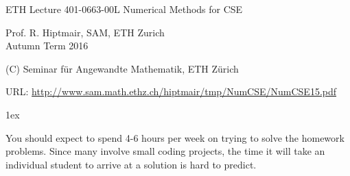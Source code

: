 \documentclass[12pt]{report}
\begin{document}
\begin{tcolorbox}[colframe=black]
\begin{minipage}[t][0.6\textwidth][c]{\textwidth}
  ETH Lecture 401-0663-00L  Numerical Methods for CSE 
  \B\vspace{1.5cm}
  
  \begin{center}
  \end{center}
  \vspace{1.5cm}
  
  \begin{center}
  \begin{large}
    {\Large Prof. R. Hiptmair, SAM, ETH Zurich}\\[1.5ex]

    Autumn Term 2016 %

    (C) Seminar f\"ur Angewandte Mathematik, ETH Z\"urich
    \samskip

    URL: \href{http://www.sam.math.ethz.ch/~hiptmair/tmp/NumCSE/NumCSE15.pdf}{%
      http://www.sam.math.ethz.ch/hiptmair/tmp/NumCSE/NumCSE15.pdf}
  \end{large}
\end{center}
\end{minipage}
\end{tcolorbox}
\bigskip

\fboxsep1ex
\bigskip

You should expect to spend 4-6 hours per week on trying to solve the homework
problems. Since many involve small coding projects, the time it will take an
individual student to arrive at a solution is hard to predict.  
\bigskip
\end{document}
